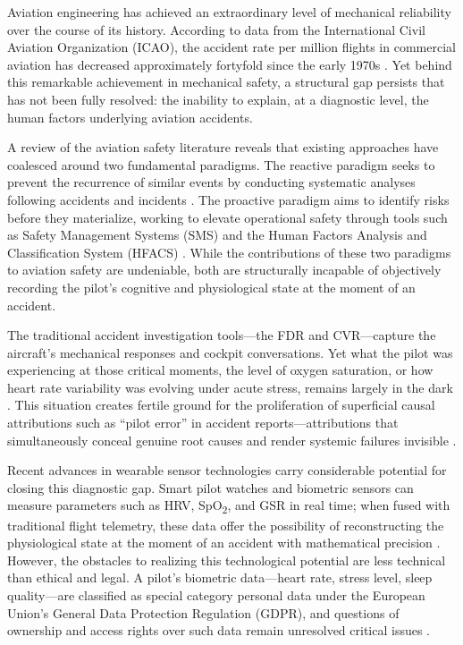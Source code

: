 \documentclass[12pt,a4paper]{article}
\begin{document}
Aviation engineering has achieved an extraordinary level of mechanical reliability
over the course of its history. According to data from the International Civil Aviation
Organization (ICAO), the accident rate per million flights in commercial aviation has
decreased approximately fortyfold since the early 1970s \citep{icao2022}. Yet behind
this remarkable achievement in mechanical safety, a structural gap persists that has not
been fully resolved: the inability to explain, at a diagnostic level, the human factors
underlying aviation accidents.

A review of the aviation safety literature reveals that existing approaches have coalesced
around two fundamental paradigms. The reactive paradigm seeks to prevent the recurrence of
similar events by conducting systematic analyses following accidents and incidents \citep{gerede2018}.
The proactive paradigm aims to identify risks before they materialize, working to elevate
operational safety through tools such as Safety Management Systems (SMS) and the Human
Factors Analysis and Classification System (HFACS) \citep{shappell2000}. While the contributions
of these two paradigms to aviation safety are undeniable, both are structurally incapable of
objectively recording the pilot's cognitive and physiological state at the moment of an accident.

The traditional accident investigation tools---the FDR and CVR---capture the aircraft's
mechanical responses and cockpit conversations. Yet what the pilot was experiencing at those
critical moments, the level of oxygen saturation, or how heart rate variability was evolving
under acute stress, remains largely in the dark \citep{dehais2020}. This situation creates
fertile ground for the proliferation of superficial causal attributions such as ``pilot error''
in accident reports---attributions that simultaneously conceal genuine root causes and render
systemic failures invisible \citep{reason2000}.

Recent advances in wearable sensor technologies carry considerable potential for closing this
diagnostic gap. Smart pilot watches and biometric sensors can measure parameters such as HRV,
SpO\textsubscript{2}, and GSR in real time; when fused with traditional flight telemetry,
these data offer the possibility of reconstructing the physiological state at the moment of
an accident with mathematical precision \citep{cantekin2025a}. However, the obstacles to
realizing this technological potential are less technical than ethical and legal. A pilot's
biometric data---heart rate, stress level, sleep quality---are classified as special category
personal data under the European Union's General Data Protection Regulation (GDPR), and
questions of ownership and access rights over such data remain unresolved critical issues
\citep{erdinc2020}.
\end{document}

